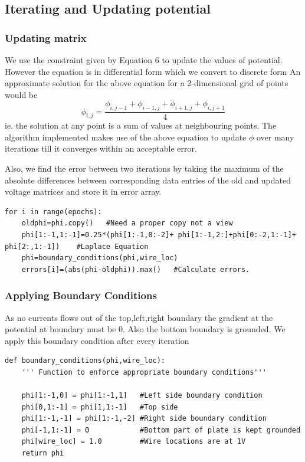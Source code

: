 \documentclass{article}
\begin{document}
\subsection{Iterating and Updating potential}
\subsubsection{Updating matrix}
We use the constraint given by Equation 6 to update the values of potential. However the equation is in differential form which we convert to discrete form 
An approximate solution for the above equation for a 2-dimensional grid of points would be 
\begin{equation*}
\phi_{i,j} = \frac{\phi_{i,j-1}+\phi_{i-1,j}+\phi_{i+1,j}+\phi_{i,j+1}}{4} 
\end{equation*}
ie. the solution at any point is a sum of values at neighbouring points. The algorithm implemented makes 
use of the above equation to update $\phi$  over many iterations till it converges within an acceptable error.

Also, we find the error between two iterations by taking the maximum of the absolute differences between corresponding 
data entries of the old and updated voltage matrices and store it in error array.

\begin{lstlisting}
for i in range(epochs):
    oldphi=phi.copy()   #Need a proper copy not a view
    phi[1:-1,1:-1]=0.25*(phi[1:-1,0:-2]+ phi[1:-1,2:]+phi[0:-2,1:-1]+ phi[2:,1:-1])    #Laplace Equation
    phi=boundary_conditions(phi,wire_loc)
    errors[i]=(abs(phi-oldphi)).max()   #Calculate errors.
\end{lstlisting}

\subsubsection{Applying Boundary Conditions}
As no currents flows out of the top,left,right boundary the gradient at the potential at boundary must be 0. 
Also the bottom boundary is grounded. We apply this boundary condition after every iteration
\begin{lstlisting}
def boundary_conditions(phi,wire_loc):
    ''' Function to enforce appropriate boundary conditions''' 

    phi[1:-1,0] = phi[1:-1,1]   #Left side boundary condition
    phi[0,1:-1] = phi[1,1:-1]   #Top side
    phi[1:-1,-1] = phi[1:-1,-2] #Right side boundary condition
    phi[-1,1:-1] = 0            #Bottom part of plate is kept grounded
    phi[wire_loc] = 1.0         #Wire locations are at 1V
    return phi
\end{lstlisting}
\end{document}
